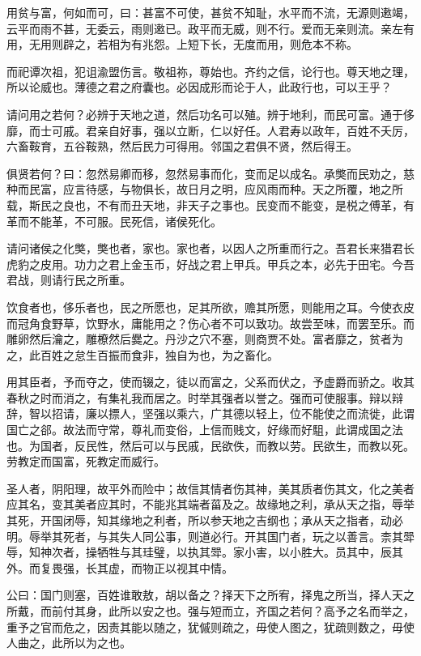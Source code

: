 \documentclass[]{article}
\begin{document}
用贫与富，何如而可，曰：甚富不可使，甚贫不知耻，水平而不流，无源则遫竭，云平而雨不甚，无委云，雨则遫已。政平而无威，则不行。爱而无亲则流。亲左有用，无用则辟之，若相为有兆怨。上短下长，无度而用，则危本不称。

而祀谭次祖，犯诅渝盟伤言。敬祖祢，尊始也。齐约之信，论行也。尊天地之理，所以论威也。薄德之君之府囊也。必因成形而论于人，此政行也，可以王乎？

请问用之若何？必辨于天地之道，然后功名可以殖。辨于地利，而民可富。通于侈靡，而士可戚。君亲自好事，强以立断，仁以好任。人君寿以政年，百姓不夭厉，六畜鞍育，五谷鞍熟，然后民力可得用。邻国之君俱不贤，然后得王。

俱贤若何？曰：忽然易卿而移，忽然易事而化，变而足以成名。承獘而民劝之，慈种而民富，应言待感，与物俱长，故日月之明，应风雨而种。天之所覆，地之所载，斯民之良也，不有而丑天地，非天子之事也。民变而不能变，是棁之傅革，有革而不能革，不可服。民死信，诸侯死化。

请问诸侯之化獘，獘也者，家也。家也者，以因人之所重而行之。吾君长来猎君长虎豹之皮用。功力之君上金玉币，好战之君上甲兵。甲兵之本，必先于田宅。今吾君战，则请行民之所重。

饮食者也，侈乐者也，民之所愿也，足其所欲，赡其所愿，则能用之耳。今使衣皮而冠角食野草，饮野水，庸能用之？伤心者不可以致功。故尝至味，而罢至乐。而雕卵然后瀹之，雕橑然后爨之。丹沙之穴不塞，则商贾不处。富者靡之，贫者为之，此百姓之怠生百振而食非，独自为也，为之畜化。

用其臣者，予而夺之，使而辍之，徒以而富之，父系而伏之，予虚爵而骄之。收其春秋之时而消之，有集礼我而居之。时举其强者以誉之。强而可使服事。辩以辩辞，智以招请，廉以摽人，坚强以乘六，广其德以轻上，位不能使之而流徙，此谓国亡之郤。故法而守常，尊礼而变俗，上信而贱文，好缘而好駔，此谓成国之法也。为国者，反民性，然后可以与民戚，民欲佚，而教以劳。民欲生，而教以死。劳教定而国富，死教定而威行。

圣人者，阴阳理，故平外而险中；故信其情者伤其神，美其质者伤其文，化之美者应其名，变其美者应其时，不能兆其端者菑及之。故缘地之利，承从天之指，辱举其死，开国闭辱，知其缘地之利者，所以参天地之吉纲也；承从天之指者，动必明。辱举其死者，与其失人同公事，则道必行。开其国门者，玩之以善言。柰其斝辱，知神次者，操牺牲与其珪璧，以执其斝。家小害，以小胜大。员其中，辰其外。而复畏强，长其虚，而物正以视其中情。

公曰：国门则塞，百姓谁敢敖，胡以备之？择天下之所宥，择鬼之所当，择人天之所戴，而前付其身，此所以安之也。强与短而立，齐国之若何？高予之名而举之，重予之官而危之，因责其能以随之，犹傶则疏之，毋使人图之，犹疏则数之，毋使人曲之，此所以为之也。
\end{document}
